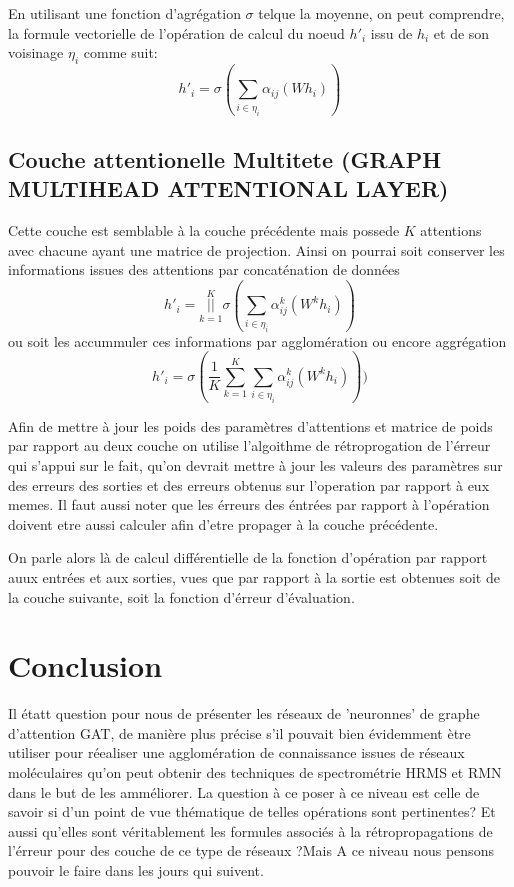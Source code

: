 \documentclass[12pt,a4paper]{report}
\begin{document}
    En utilisant une fonction d'agrégation $ \sigma $ telque la moyenne, on peut comprendre, la formule vectorielle de l'opération de calcul du noeud  $h'_{i}$ issu de $h_{i}$ et de son voisinage $\eta_{i}$ comme suit:
    $$
    h'_{i} = \sigma( \sum_{ i \in \eta_{i} } \alpha_{ij}(Wh_{i}) )
    $$

    \subsection{Couche attentionelle Multitete (GRAPH MULTIHEAD ATTENTIONAL LAYER)}
    Cette couche est semblable à la couche précédente mais possede $K$ attentions
    avec chacune ayant une matrice de projection. Ainsi on pourrai soit conserver les informations issues des attentions par concaténation de données
    $$
    h'_{i} = {\overset{K}{\underset{k=1}{||}} \sigma( \sum_{ i \in \eta_{i} } \alpha^{k}_{ij}(W^{k}h_{i}) )  }
    $$ 
    ou soit les accummuler ces informations par agglomération ou encore aggrégation
     $$
    h'_{i} =  \sigma( \frac{1}{K} \sum_{ k = 1 }^K \sum_{ i \in \eta_{i} } \alpha^{k}_{ij}(W^{k}h_{i}) ) )
    $$

    Afin de mettre à jour les poids des paramètres d'attentions et matrice de poids par rapport au deux couche on utilise l'algoithme de rétroprogation de l'érreur qui s'appui sur le fait, qu'on devrait mettre à jour les valeurs des paramètres sur des erreurs des sorties et des erreurs obtenus sur l'operation  par rapport à eux memes. Il faut aussi noter que les érreurs des éntrées par rapport à l'opération doivent etre aussi calculer afin d'etre propager à la couche précédente. 
    
    On parle alors là de calcul différentielle de la fonction d'opération par rapport auux entrées et aux sorties, vues que par rapport à la sortie est obtenues soit de la couche suivante, soit la fonction d'érreur d'évaluation.
    
    \section{Conclusion}
    Il étatt question pour nous de présenter les réseaux de 'neuronnes' de graphe d'attention GAT, de manière plus précise s'il pouvait bien évidemment ètre utiliser pour réealiser une agglomération de connaissance issues de réseaux moléculaires qu'on peut obtenir des techniques de spectrométrie HRMS et RMN dans le but de les amméliorer. La question à ce poser à ce niveau est celle de savoir si d'un point de vue thématique de telles opérations sont pertinentes? Et aussi qu'elles sont véritablement les formules associés à la rétropropagations de l'érreur pour des couche de ce type de réseaux ?Mais A ce niveau nous pensons pouvoir le faire dans les jours qui suivent.

    

\end{document}
